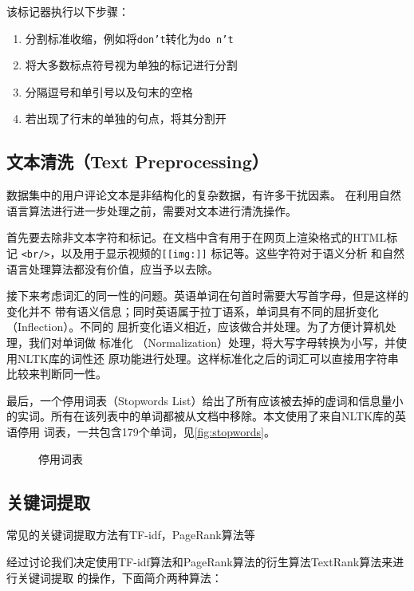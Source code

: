该标记器执行以下步骤：
\begin{enumerate}
\item 分割标准收缩，例如将\texttt{don't}转化为\texttt{do n't}
\item 将大多数标点符号视为单独的标记进行分割
\item 分隔逗号和单引号以及句末的空格
\item 若出现了行末的单独的句点，将其分割开
\end{enumerate}

\subsection{文本清洗（Text Preprocessing）}
数据集中的用户评论文本是非结构化的复杂数据，有许多干扰因素。
在利用自然语言算法进行进一步处理之前，需要对文本进行清洗操作。

首先要去除非文本字符和标记。在文档中含有用于在网页上渲染格式的HTML标记
\texttt{<br/>}，以及用于显示视频的\texttt{[[img:]]} 标记等。这些字符对于语义分析
和自然语言处理算法都没有价值，应当予以去除。

接下来考虑词汇的同一性的问题。英语单词在句首时需要大写首字母，但是这样的变化并不
带有语义信息；同时英语属于拉丁语系，单词具有不同的屈折变化（Inflection）。不同的
屈折变化语义相近，应该做合并处理。为了方便计算机处理，我们对单词做{\fKai
标准化} （Normalization）处理，将大写字母转换为小写，并使用NLTK库的{\fKai 词性还
原}功能进行处理。这样标准化之后的词汇可以直接用字符串比较来判断同一性。

最后，一个{\fKai 停用词表}（Stopwords List）给出了所有应该被去掉的虚词和信息量小
的实词。所有在该列表中的单词都被从文档中移除。本文使用了来自NLTK库的英语停用
词表，一共包含179个单词，见\autoref{fig:stopwords}。

\begin{figure}
    \noindent{}
\caption{停用词表}\label{fig:stopwords}
\end{figure}

\subsection{关键词提取}
常见的关键词提取方法有TF-idf，PageRank算法等

经过讨论我们决定使用TF-idf算法和PageRank算法的衍生算法TextRank算法来进行关键词提取
的操作，下面简介两种算法：

